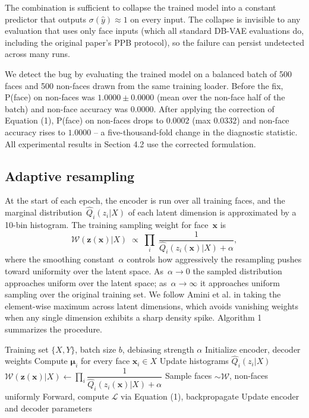 \documentclass[10pt,twocolumn]{article}
\begin{document}
The combination is sufficient to collapse the trained model into a constant
predictor that outputs $\sigma(\hat{y}) \approx 1$ on every input. The
collapse is invisible to any evaluation that uses only face inputs (which
all standard DB-VAE evaluations do, including the original paper's PPB
protocol), so the failure can persist undetected across many runs.

We detect the bug by evaluating the trained model on a balanced batch of
500 faces and 500 non-faces drawn from the same training loader. Before
the fix, P(face) on non-faces was $1.0000 \pm 0.0000$ (mean over the
non-face half of the batch) and non-face accuracy was $0.0000$. After
applying the correction of Equation (1), P(face) on non-faces drops
to $0.0002$ (max $0.0332$) and non-face accuracy rises to $1.0000$ -- a
five-thousand-fold change in the diagnostic statistic. All experimental
results in Section 4.2 use the corrected formulation.

\subsection{Adaptive resampling}
\label{sec:resample}

At the start of each epoch, the encoder is run over all training faces, and
the marginal distribution~$\hat{Q}_i(z_i | X)$ of each latent dimension is
approximated by a 10-bin histogram. The training sampling weight for
face~$\mathbf{x}$ is
\begin{equation}
    \mathcal{W}(\mathbf{z}(\mathbf{x}) | X) \;\propto\;
    \prod_{i}\;\frac{1}{\hat{Q}_i(z_i(\mathbf{x}) | X) + \alpha},
    \label{eq:weights}
\end{equation}
where the smoothing constant~$\alpha$ controls how aggressively the
resampling pushes toward uniformity over the latent space.
As~$\alpha \to 0$ the sampled distribution approaches uniform over the
latent space; as~$\alpha \to \infty$ it approaches uniform sampling over
the original training set. We follow Amini et al. in taking the
element-wise maximum across latent dimensions, which avoids vanishing
weights when any single dimension exhibits a sharp density spike.
Algorithm 1 summarizes the procedure.

\begin{algorithm}[H]
    \caption{DB-VAE training with adaptive resampling}
    \label{alg:dbvae}
    \begin{algorithmic}[1]
        \Require Training set $\{X, Y\}$, batch size $b$, debiasing strength $\alpha$
        \State Initialize encoder, decoder weights
            \State Compute $\boldsymbol{\mu}_i$ for every face $\mathbf{x}_i \in X$
            \State Update histograms $\hat{Q}_i(z_i | X)$
            \State $\mathcal{W}(\mathbf{z}(\mathbf{x}) | X) \gets \prod_{i} \dfrac{1}{\hat{Q}_i(z_i(\mathbf{x}) | X) + \alpha}$
                \State Sample faces $\sim \mathcal{W}$, non-faces uniformly
                \State Forward, compute $\mathcal{L}$ via Equation (1), backpropagate
                \State Update encoder and decoder parameters
            \EndFor
        \EndFor
    \end{algorithmic}
\end{algorithm}
\end{document}
